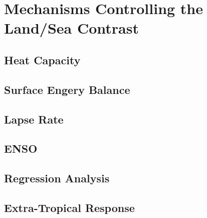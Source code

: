 \chapter{Mechanisms Controlling the Land/Sea Contrast} 

\label{mechanisms} 



\section{Heat Capacity}


\section{Surface Engery Balance}


\section{Lapse Rate}



\section{ENSO}




\section{Regression Analysis}



\section{Extra-Tropical Response}